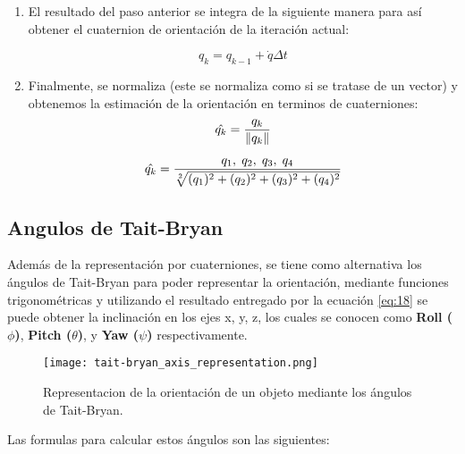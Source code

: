 \begin{enumerate}
        \item El resultado del paso anterior se integra de la siguiente manera para así obtener el cuaternion de orientación de la iteración actual:
        
        \begin{equation}
            q_k = q_{k-1} + \dot{q} \Delta t 
        \end{equation}
    
        \item Finalmente, se normaliza (este se normaliza como si se tratase de un vector) y obtenemos la estimación de la orientación en terminos de cuaterniones:
        \begin{equation}
            \hat{q_k} = \frac{q_k}{\lVert q_k\rVert} 
        \end{equation}        
            
        \begin{equation} \label{eq:18}
            \hat{q_k} = \frac{q_1, \hspace{1mm} q_2, \hspace{1mm} q_3, \hspace{1mm} q_4}{\sqrt[2]{(q_1)^2 + (q_2)^2 + (q_3)^2 + (q_4)^2}} 
        \end{equation}
            
    \end{enumerate}

    \subsection{Angulos de Tait-Bryan}

    Además de la representación por cuaterniones, se tiene como alternativa los ángulos de Tait-Bryan para poder representar la orientación, mediante funciones
    trigonométricas y utilizando el resultado entregado por la ecuación \ref{eq:18} se puede obtener la inclinación en los ejes x, y, z, los cuales se conocen 
    como \textbf{Roll ($ \phi $)}, \textbf{Pitch ($ \theta  $)}, y \textbf{Yaw ($ \psi  $)} respectivamente.

    \begin{figure}[htp!]
        \centering
             \texttt{[image: tait-bryan\_axis\_representation.png]}
              \caption{Representacion de la orientación de un objeto mediante los ángulos de Tait-Bryan.}
    \end{figure}
    \FloatBarrier 

    Las formulas para calcular estos ángulos son las siguientes:

